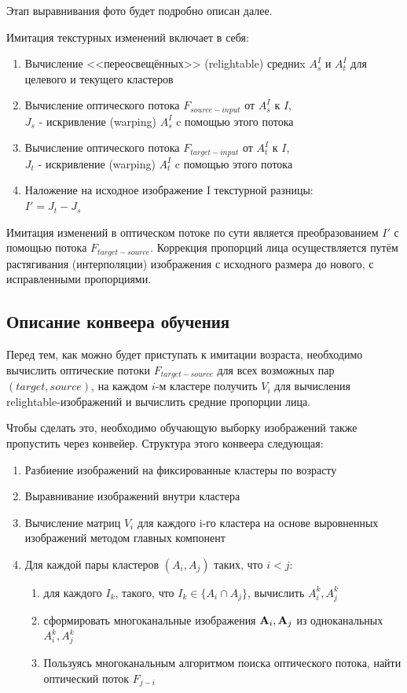 Этап выравнивания фото будет подробно описан далее.

Имитация текстурных изменений включает в себя:
\begin{enumerate}
  \item Вычисление <<переосвещённых>> (relightable) средниx $ A^I_s $ и $ A^I_t $ для целевого и текущего кластеров
  \item Вычисление оптического потока $ F_{source-input} $ от $ A^I_s $ к $I$, \\
   $ J_s $ - искривление (warping) $ A^I_s $ c помощью этого потока
  \item Вычисление оптического потока $ F_{target-input} $ от $ A^I_t $ к $I$, \\
  $ J_t $ - искривление (warping) $ A^I_t $ c помощью этого потока
  \item Наложение на исходное изображение I текстурной разницы: \\
   $ I' = J_t - J_s $
\end{enumerate}

Имитация изменений в оптическом потоке по сути является преобразованием $I'$ с помощью потока $F_{target-source}$.
Коррекция пропорций лица осуществляется путём растягивания (интерполяции) изображения с исходного размера до нового, с исправленными пропорциями.

\subsection{Описание конвеера обучения}

Перед тем, как можно будет приступать к имитации возраста, необходимо вычислить оптические потоки $F_{target-source}$ для всех возможных пар $(target, source)$, на каждом $i$-м кластере получить $ V_i $ для вычисления relightable-изображений и вычислить средние пропорции лица.

Чтобы сделать это, необходимо обучающую выборку изображений также пропустить через конвейер. Структура этого конвеера следующая:
\begin{enumerate}
  \item Разбиение изображений на фиксированные кластеры по возрасту
  \item Выравнивание изображений внутри кластера
  \item Вычисление матриц $ V_i $ для каждого i-го кластера на основе выровненных изображений методом главных компонент
  \item Для каждой пары кластеров $ (A_i, A_j) $ таких, что $ i < j $:
  \begin{enumerate}
    \item для каждого $I_k$, такого, что $ I_k \in \lbrace A_i \cap A_j \rbrace $, вычислить $ A_i^k, A_j^k $
    \item сформировать многоканальные изображения $ \bold{A}_i , \bold{A}_j $  из одноканальных $ A_i^k, A_j^k $
    \item Пользуясь многоканальным алгоритмом поиска оптического потока, найти оптический поток $F_{j-i}$
  \end{enumerate}
\end{enumerate}

